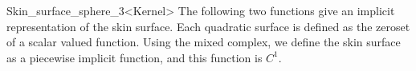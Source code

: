 \begin{ccRefClass}{Skin_surface_sphere_3<Kernel>}
The following two functions give an implicit representation of the
skin surface. Each quadratic surface is defined as the zeroset of a
scalar valued function. Using the mixed complex, we define the skin
surface as a piecewise implicit function, and this function is $C^1$.


\ccGlue {}

\ccSeeAlso
{}\\
\end{ccRefClass}
